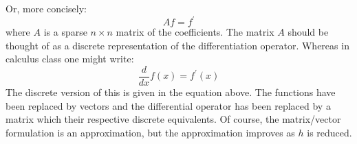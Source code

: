 Or, more concisely:
\begin{equation*}
Af = f^{\prime}
\end{equation*}
where $A$ is a sparse $n \times n$ matrix of the coefficients.  The matrix $A$ should be thought of as a discrete representation of the differentiation operator.  Whereas in calculus class one might write:
\begin{equation*}
\frac{d}{dx}f(x) = f^{\prime}(x)
\end{equation*}
The discrete version of this is given in the equation above.  The functions have been replaced by vectors and the differential operator has been replaced by a matrix which their respective discrete equivalents. Of course, the matrix/vector formulation is an approximation, but the approximation improves as $h$ is reduced.

\vspace{0.2cm}

